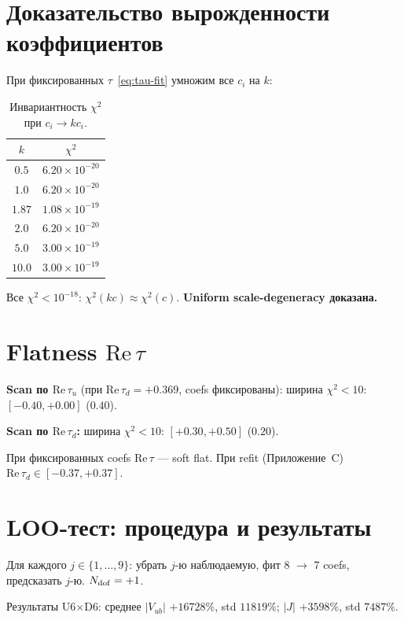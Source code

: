 \documentclass[12pt,a4paper]{article}
\numberwithin{equation}{section}
\begin{document}
\section{Доказательство вырожденности коэффициентов}
\label{app:degeneracy}

При фиксированных $\tau$~\eqref{eq:tau-fit} умножим все $c_i$ на $k$:

\begin{table}[H]
\centering
\caption{Инвариантность $\chi^2$ при $c_i \to k c_i$.}
\begin{tabular}{cc}
\toprule
$k$ & $\chi^2$ \\
\midrule
$0.5$  & $6.20\times10^{-20}$ \\
$1.0$  & $6.20\times10^{-20}$ \\
$1.87$ & $1.08\times10^{-19}$ \\
$2.0$  & $6.20\times10^{-20}$ \\
$5.0$  & $3.00\times10^{-19}$ \\
$10.0$ & $3.00\times10^{-19}$ \\
\bottomrule
\end{tabular}
\end{table}

Все $\chi^2 < 10^{-18}$: $\chi^2(kc) \approx \chi^2(c)$.
\textbf{Uniform scale-degeneracy доказана.}

\section{Flatness $\mathrm{Re}\,\tau$}
\label{app:flatness}

\textbf{Scan по $\mathrm{Re}\,\tau_u$} (при $\mathrm{Re}\,\tau_d = +0.369$,
coefs фиксированы): ширина $\chi^2<10$: $[-0.40, +0.00]$ ($0.40$).

\textbf{Scan по $\mathrm{Re}\,\tau_d$:} ширина $\chi^2<10$: $[+0.30, +0.50]$ ($0.20$).

При фиксированных coefs $\mathrm{Re}\,\tau$ --- soft flat.
При refit (Приложение~C) $\mathrm{Re}\,\tau_d \in [-0.37, +0.37]$.

\section{LOO-тест: процедура и результаты}
\label{app:loo}

Для каждого $j \in \{1,\ldots,9\}$: убрать $j$-ю наблюдаемую,
фит 8 $\to$ 7 coefs, предсказать $j$-ю. $N_{\rm dof} = +1$.

Результаты U6$\times$D6: среднее $|V_{ub}|$ $+16728\%$, std $11819\%$;
$|J|$ $+3598\%$, std $7487\%$.
\end{document}
